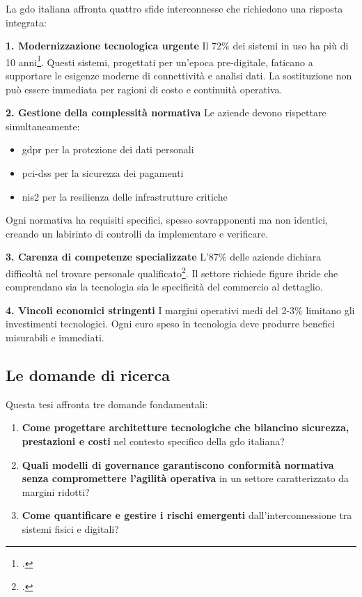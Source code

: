 La \gls{gdo} italiana affronta quattro sfide interconnesse che richiedono una risposta integrata:

\textbf{1. Modernizzazione tecnologica urgente}
Il 72\% dei sistemi in uso ha più di 10 anni\footcite{federdistribuzione2023}. Questi sistemi, progettati per un'epoca pre-digitale, faticano a supportare le esigenze moderne di connettività e analisi dati. La sostituzione non può essere immediata per ragioni di costo e continuità operativa.

\textbf{2. Gestione della complessità normativa}
Le aziende devono rispettare simultaneamente:
\begin{itemize}
\item \gls{gdpr} per la protezione dei dati personali
\item \gls{pci-dss} per la sicurezza dei pagamenti
\item \gls{nis2} per la resilienza delle infrastrutture critiche
\end{itemize}

Ogni normativa ha requisiti specifici, spesso sovrapponenti ma non identici, creando un labirinto di controlli da implementare e verificare.

\textbf{3. Carenza di competenze specializzate}
L'87\% delle aziende dichiara difficoltà nel trovare personale qualificato\footcite{osservatorio2024}. Il settore richiede figure ibride che comprendano sia la tecnologia sia le specificità del commercio al dettaglio.

\textbf{4. Vincoli economici stringenti}
I margini operativi medi del 2-3\% limitano gli investimenti tecnologici. Ogni euro speso in tecnologia deve produrre benefici misurabili e immediati.

\subsection{\texorpdfstring{Le domande di ricerca}{1.2.2 - Le domande di ricerca}}
\label{subsec:domande_ricerca}

Questa tesi affronta tre domande fondamentali:

\begin{enumerate}
\item \textbf{Come progettare architetture tecnologiche che bilancino sicurezza, prestazioni e costi} nel contesto specifico della \gls{gdo} italiana?

\item \textbf{Quali modelli di governance garantiscono conformità normativa senza compromettere l'agilità operativa} in un settore caratterizzato da margini ridotti?

\item \textbf{Come quantificare e gestire i rischi emergenti} dall'interconnessione tra sistemi fisici e digitali?
\end{enumerate}

